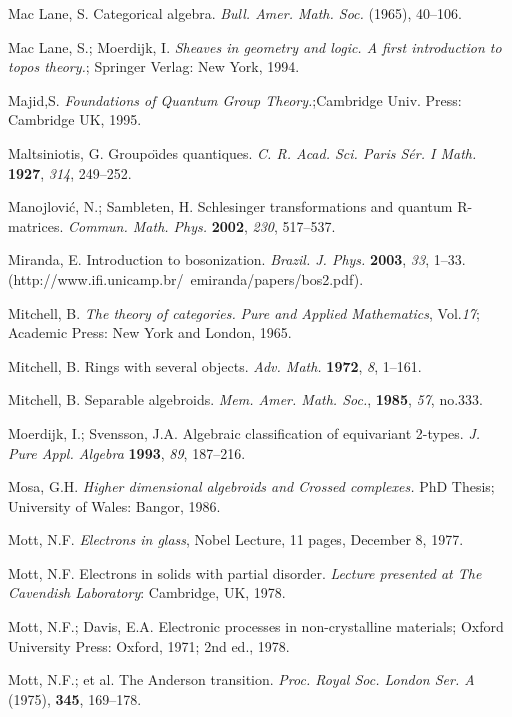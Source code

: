\documentclass[12pt]{article}
\theoremstyle{plain}
\theoremstyle{definition}
\numberwithin{equation}{section}
\begin{document}
\begin{thebibliography}{199}
Mac Lane, S. Categorical algebra. \emph{Bull. Amer. Math. Soc.} (1965), 40--106.

Mac Lane, S.; Moerdijk, I.  \emph{Sheaves in geometry and logic. A first introduction to topos theory.}; Springer Verlag: New York, 1994.

Majid,S. \emph{Foundations of Quantum Group Theory.};Cambridge Univ. Press: Cambridge UK, 1995.

Maltsiniotis, G. Groupo\"{\i}des quantiques. {\em C. R. Acad. Sci. Paris S\'er. I Math.} {\bf 1927}, {\em 314}, 249--252.

Manojlovi\'{c}, N.; Sambleten, H.  Schlesinger transformations and quantum R-matrices. \emph{Commun. Math. Phys.} {\bf 2002}, {\em 230}, 517--537.

Miranda, E. Introduction to bosonization. {\em Brazil. J. Phys.} {\bf 2003}, {\em 33}, 1--33. (http://www.ifi.unicamp.br/~emiranda/papers/bos2.pdf).

Mitchell, B. {\em The theory of categories.} {\em Pure and Applied Mathematics}, Vol.{\em  17}; Academic Press: New York and London, 1965.

Mitchell, B. Rings with several objects. {\em Adv. Math.} {\bf 1972}, {\em 8}, 1--161.

Mitchell, B. Separable algebroids. {\em Mem. Amer. Math. Soc.}, {\bf 1985}, {\em 57}, no.333.

Moerdijk, I.; Svensson, J.A. Algebraic classification of equivariant 2-types. {\em J. Pure Appl. Algebra} {\bf 1993}, {\em 89}, 187--216.

Mosa, G.H. \emph{Higher dimensional algebroids and Crossed complexes.} PhD Thesis; University of Wales: Bangor, 1986.

Mott, N.F. \emph{Electrons in glass}, Nobel Lecture, 11 pages, December 8, 1977.

Mott, N.F.  Electrons in solids with partial disorder. \emph{Lecture presented at The Cavendish Laboratory}: Cambridge, UK, 1978.

Mott, N.F.; Davis, E.A. {Electronic processes in non-crystalline materials}; Oxford University Press: Oxford, 1971; 2nd ed., 1978.

Mott, N.F.; et al. The Anderson transition. \emph{Proc. Royal Soc. London Ser. A} (1975), {\bf 345}, 169--178.


\end{thebibliography}
\end{document}
